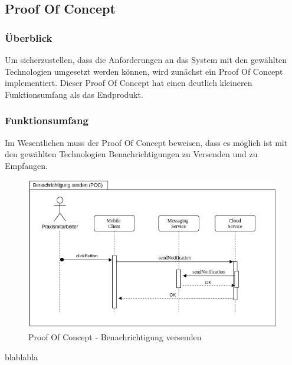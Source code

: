 \subsection{Proof Of Concept}\label{subsec:poc}

\subsubsection*{Überblick}

Um sicherzustellen, dass die Anforderungen an das System mit den gewählten Technologien umgesetzt werden
können, wird zunächst ein Proof Of Concept implementiert. Dieser Proof Of Concept hat einen deutlich kleineren
Funktionsumfang als das Endprodukt.

\subsubsection*{Funktionsumfang}

Im Wesentlichen muss der Proof Of Concept beweisen, dass es möglich ist mit den
gewählten Technologien Benachrichtigungen zu Versenden und zu Empfangen.



\begin{figure}[h]
    \centering
    \begin{minipage}[b]{1.0\textwidth}
        \includegraphics[width=\textwidth]{graphics/Sequence_POC_Send}
        \caption{Proof Of Concept - Benachrichtigung versenden}
    \end{minipage}
\end{figure}



blablabla




